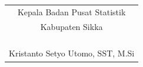 \documentclass{article}
\begin{document}
\bigskip
\hfill
\begin{tabular}{@{}c}
Kepala Badan Pusat Statistik\\
Kabupaten Sikka \bigskip\\
\\
\\
\\
\\
Kristanto Setyo Utomo, SST, M.Si
\end{tabular}



%
%
%
\end{document}

